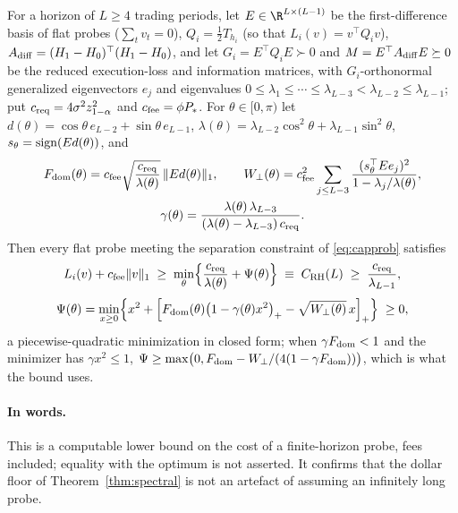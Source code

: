 \begin{theorem}\label{thm:rh}
For a horizon of $L\ge4$ trading periods, let $E\in\R^{L\times(L-1)}$ be the first-difference basis of flat probes ($\sum_tv_t=0$), $Q_i=\tfrac12T_{h_i}$ (so that $L_i(v)=v^\top Q_iv$), $A_{\rm diff}=(H_1-H_0)^\top(H_1-H_0)$, and let $G_i=E^\top Q_iE\succ0$ and $M=E^\top A_{\rm diff}E\succeq0$ be the reduced execution-loss and information matrices, with $G_i$-orthonormal generalized eigenvectors $e_j$ and eigenvalues $0\le\lambda_1\le\cdots\le\lambda_{L-3}<\lambda_{L-2}\le\lambda_{L-1}$; put $c_{\rm req}=4\sigma^2z_{1-\alpha}^2$ and $c_{\rm fee}=\phi P_*$. For $\theta\in[0,\pi)$ let $d(\theta)=\cos\theta\,e_{L-2}+\sin\theta\,e_{L-1}$, $\lambda(\theta)=\lambda_{L-2}\cos^2\theta+\lambda_{L-1}\sin^2\theta$, $s_\theta={\rm sign}(Ed(\theta))$, and
\begin{equation}\label{eq:rhdefs}
\begin{gathered}
F_{\rm dom}(\theta)=c_{\rm fee}\sqrt{\frac{c_{\rm req}}{\lambda(\theta)}}\,\|Ed(\theta)\|_1,\qquad W_\perp(\theta)=c_{\rm fee}^2\sum_{j\le L-3}\frac{(s_\theta^\top Ee_j)^2}{1-\lambda_j/\lambda(\theta)},\\
\gamma(\theta)=\frac{\lambda(\theta)\,\lambda_{L-3}}{(\lambda(\theta)-\lambda_{L-3})\,c_{\rm req}} .
\end{gathered}
\end{equation}
Then every flat probe meeting the separation constraint of \eqref{eq:capprob} satisfies
\begin{equation}\label{eq:rh}
L_i(v)+c_{\rm fee}\|v\|_1\;\ge\;\min_{\theta}\Bigl\{\frac{c_{\rm req}}{\lambda(\theta)}+\Psi(\theta)\Bigr\}\;\equiv\;C_{\rm RH}(L)\;\ge\;\frac{c_{\rm req}}{\lambda_{L-1}},
\end{equation}
\[
\Psi(\theta)=\min_{x\ge0}\Bigl\{x^2+\Bigl[F_{\rm dom}(\theta)\bigl(1-\gamma(\theta)x^2\bigr)_+-\sqrt{W_\perp(\theta)}\,x\Bigr]_+\Bigr\}\;\ge0 ,
\]
a piecewise-quadratic minimization in closed form; when $\gamma F_{\rm dom}<1$ and the minimizer has $\gamma x^2\le1$, $\Psi\ge\max\bigl(0,F_{\rm dom}-W_\perp/(4(1-\gamma F_{\rm dom}))\bigr)$, which is what the bound uses.
\end{theorem}

\paragraph{In words.} This is a computable lower bound on the cost of a finite-horizon probe, fees included; equality with the optimum is not asserted. It confirms that the dollar floor of Theorem~\ref{thm:spectral} is not an artefact of assuming an infinitely long probe.

